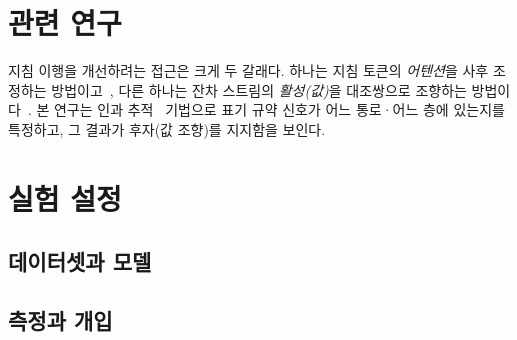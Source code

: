\documentclass[twocolumn, 10pt]{article}
\begin{document}
\section{관련 연구}
지침 이행을 개선하려는 접근은 크게 두 갈래다. 하나는 지침 토큰의 \emph{어텐션}을
사후 조정하는 방법이고~\cite{venkateswaran:spotlight, zhang:pasta}, 다른 하나는
잔차 스트림의 \emph{활성(값)}을 대조쌍으로 조향하는
방법이다~\cite{rimsky:caa, li:iti, todd:functionvectors}.
본 연구는 인과 추적~\cite{meng:rome} 기법으로 표기 규약 신호가 어느 통로·어느 층에
있는지를 특정하고, 그 결과가 후자(값 조향)를 지지함을 보인다.

\section{실험 설정}
\subsection{데이터셋과 모델}

\subsection{측정과 개입}
\end{document}
